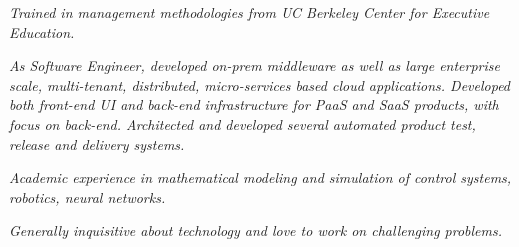 

{\selectfont
	\begin{justify}\textit{Trained in management methodologies from UC Berkeley Center for Executive Education.}\end{justify}
	
	\begin{justify}\textit{As Software Engineer, developed on-prem middleware as well as large enterprise scale, multi-tenant, distributed, micro-services based cloud applications. Developed both front-end UI and back-end infrastructure for PaaS and SaaS products, with focus on back-end. Architected and developed several automated product test, release and delivery systems.}\end{justify}

	\begin{justify}\textit{Academic experience in mathematical modeling and simulation of control systems, robotics, neural networks.}\end{justify}

	\begin{justify}\textit{Generally inquisitive about technology and love to work on challenging problems.}\end{justify}
}